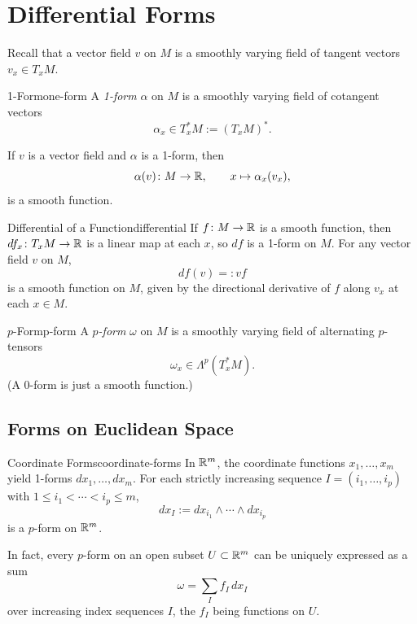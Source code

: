 
\section{Differential Forms}

Recall that a vector field $v$ on $M$ is a smoothly varying field of tangent vectors $v_x \in T_x M$.

\begin{definition}{1-Form}{one-form}
    A \emph{1-form} $\alpha$ on $M$ is a smoothly varying field of cotangent vectors
    \[
        \alpha_x \in T_x^* M := (T_x M)^*.
    \]
\end{definition}

If $v$ is a vector field and $\alpha$ is a 1-form, then
\[
    \alpha(v) \colon M \to \mathbb{R}, \qquad x \mapsto \alpha_x(v_x),
\]
is a smooth function.

\begin{example}{Differential of a Function}{differential}
    If $f \colon M \to \mathbb{R}$ is a smooth function, then $df_x \colon T_x M \to \mathbb{R}$ is a linear map at each $x$, so $df$ is a 1-form on $M$. For any vector field $v$ on $M$,
    \[
        df(v) =: vf
    \]
    is a smooth function on $M$, given by the directional derivative of $f$ along $v_x$ at each $x \in M$.
\end{example}

\begin{definition}{$p$-Form}{p-form}
    A \emph{$p$-form} $\omega$ on $M$ is a smoothly varying field of alternating $p$-tensors
    \[
        \omega_x \in \Lambda^p(T_x^* M).
    \]
    (A $0$-form is just a smooth function.)
\end{definition}

\subsection{Forms on Euclidean Space}

\begin{example}{Coordinate Forms}{coordinate-forms}
    In $\mathbb{R}^m$, the coordinate functions $x_1, \ldots, x_m$ yield 1-forms $dx_1, \ldots, dx_m$. For each strictly increasing sequence $I = (i_1, \ldots, i_p)$ with $1 \leq i_1 < \cdots < i_p \leq m$,
    \[
        dx_I := dx_{i_1} \wedge \cdots \wedge dx_{i_p}
    \]
    is a $p$-form on $\mathbb{R}^m$.
\end{example}

In fact, every $p$-form on an open subset $U \subset \mathbb{R}^m$ can be uniquely expressed as a sum
\[
    \omega = \sum_I f_I\, dx_I
\]
over increasing index sequences $I$, the $f_I$ being functions on $U$.

